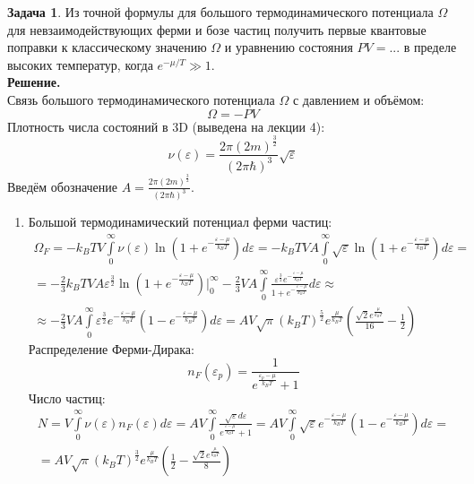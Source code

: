 \documentclass[12pt]{article}
\theoremstyle{definition}
\newtheorem{zad}{Задача}[section]
\begin{document}
\begin{zad}
Из точной формулы для большого термодинамического потенциала $\Omega$ для невзаимодействующих ферми и бозе частиц получить первые квантовые поправки к классическому значению $\Omega$ и уравнению состояния $PV=...$ в пределе высоких температур, когда $e^{-\mu/T}\gg1$.\\
\textbf{Решение.}\\
Связь большого термодинамического потенциала $\Omega$ с давлением и объёмом:
\begin{equation}
    \Omega=-PV
\end{equation}
Плотность числа состояний в 3D (выведена на лекции 4):
\begin{equation}
    \nu(\varepsilon)=\frac{2\pi(2m)^\frac{3}{2}}{(2\pi\hbar)^3}\sqrt{\varepsilon}
\end{equation}
Введём обозначение $A=\frac{2\pi(2m)^\frac{3}{2}}{(2\pi\hbar)^3}$.
\begin{enumerate}
    \item Большой термодинамический потенциал ферми частиц:
    \begin{multline}
        \Omega_F=-k_BTV\int\limits_0^\infty\nu(\varepsilon)\ln\left(1+e^{-\frac{\varepsilon-\mu}{k_BT}}\right)d\varepsilon=-k_BTVA\int\limits_0^\infty\sqrt{\varepsilon}\ln\left(1+e^{-\frac{\varepsilon-\mu}{k_BT}}\right)d\varepsilon=\\=-\frac{2}{3}k_BTVA\varepsilon^\frac{3}{2}\ln\left(1+e^{-\frac{\varepsilon-\mu}{k_BT}}\right)\bigg|_0^\infty-\frac{2}{3}VA\int\limits_0^\infty\frac{\varepsilon^\frac{3}{2}e^{-\frac{\varepsilon-\mu}{k_BT}}}{1+e^{-\frac{\varepsilon-\mu}{k_BT}}}d\varepsilon\approx\\\approx-\frac{2}{3}VA\int\limits_0^\infty\varepsilon^\frac{3}{2}e^{-\frac{\varepsilon-\mu}{k_BT}}(1-e^{-\frac{\varepsilon-\mu}{k_BT}})d\varepsilon=AV\sqrt{\pi}(k_BT)^\frac{5}{2}e^\frac{\mu}{k_BT}\left(\frac{\sqrt{2}e^\frac{\mu}{k_BT}}{16}-\frac{1}{2}\right)
    \end{multline}
    Распределение Ферми-Дирака:
\begin{equation}
    n_F(\varepsilon_p)=\frac{1}{e^{\frac{\varepsilon_p-\mu}{k_BT}}+1}
\end{equation}
Число частиц:
\begin{multline}\label{eq3}
    N=V\int\limits_0^\infty\nu(\varepsilon)n_F(\varepsilon)d\varepsilon=AV\int\limits_0^\infty\frac{\sqrt{\varepsilon}d\varepsilon}{e^\frac{\varepsilon-\mu}{k_BT}+1}=AV\int\limits_0^\infty\sqrt{\varepsilon}e^{-\frac{\varepsilon-\mu}{k_BT}}(1-e^{-\frac{\varepsilon-\mu}{k_BT}})d\varepsilon=\\=AV\sqrt{\pi}(k_BT)^\frac{3}{2}e^{\frac{\mu}{k_BT}}\left(\frac{1}{2}-\frac{\sqrt{2}e^{\frac{\mu}{k_BT}}}{8}\right)

\end{multline}
\end{enumerate}
\end{zad}
\end{document}
